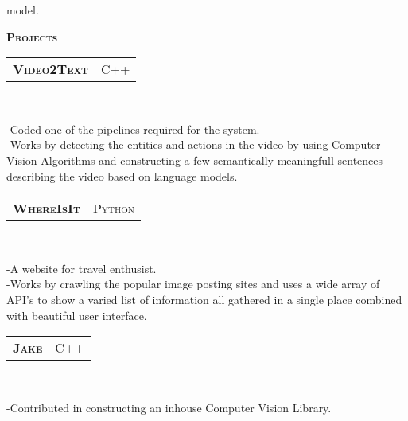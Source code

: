 \documentclass[10pt,a4paper,oneside]{article}
\begin{document}
\begin{minipage}[t]{0.63\textwidth}
\begin{adjustwidth}{7pt}{0pt}
{        model.}\\
        \end{adjustwidth}
        \textcolor{light-gray}{\textbf{\large P\textsc{rojects}}}
        \vspace{10pt}\\
        \begin{tabular}{c|c}
            \textbf{\normalsize V\textsc{ideo}2T\textsc{ext}}
            &\textmd{\normalsize C\textsc{++}}
        \end{tabular}\\
         \vspace{-4mm}
        \begin{adjustwidth}{7pt}{0pt}
        {\footnotesize -Coded one of the pipelines required
        for the system.\\
        -Works by detecting the entities and actions in the
        video by using Computer Vision Algorithms and constructing a few
        semantically meaningfull sentences describing the video
        based on language models.}\\
        \end{adjustwidth}
        \begin{tabular}{c|c}
            \textbf{\normalsize W\textsc{here}I\textsc{s}I\textsc{t}}
            &\textmd{\normalsize P\textsc{ython}}
        \end{tabular}\\
         \vspace{-4mm}
        \begin{adjustwidth}{7pt}{0pt}
        {\footnotesize -A website for travel
        enthusist.\\
        -Works by crawling the popular image posting sites and
        uses a wide array of API's to show a varied list of
        information all gathered in a single place combined with
        beautiful user interface. }\\
        \end{adjustwidth}
        \begin{tabular}{c|c}
            \textbf{\normalsize J\textsc{ake}}
            &\textmd{\normalsize C\textsc{++}}
        \end{tabular}\\
         \vspace{-4mm}
        \begin{adjustwidth}{7pt}{0pt}
        {\footnotesize -Contributed in constructing an inhouse
        Computer Vision Library.\\
}
\end{adjustwidth}
\end{minipage}
\end{document}
